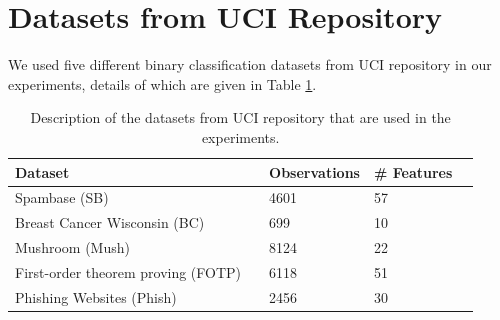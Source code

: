 \documentclass[main]{subfiles}
\begin{document}
\section{Datasets from UCI Repository}\label{sec:datasets}
We used five different binary classification datasets from UCI repository in our experiments, details of which are given in Table \ref{tab:datasets}. %

 
	
%


\begin{table} [h!] 
\caption{Description of the datasets from UCI repository that are used in the experiments.} \centering
\vspace{1em}
\begin{tabular}{llllc}
\toprule
Dataset && Observations & \# Features \\
\midrule
Spambase (SB) & & 4601 & 57 \\
\hline
Breast Cancer Wisconsin (BC)  & & 699 & 10 \\
\hline
Mushroom (Mush)& & 8124 & 22 \\
\hline
 First-order theorem proving (FOTP) & & 6118 & 51 \\
\hline
Phishing Websites (Phish) & & 2456 & 30 \\

\bottomrule
\end{tabular}\label{tab:datasets}
\end{table}
\end{document}

